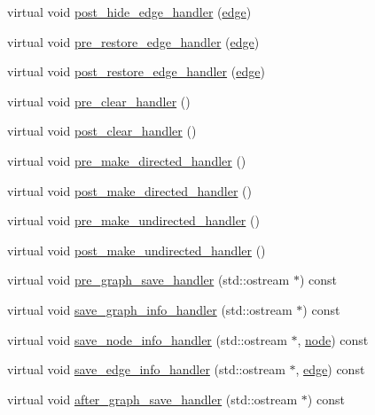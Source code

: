 \begin{DoxyCompactItemize}
virtual void \mbox{\hyperlink{classgraph_ad4614e74a125054eb3e180f6f32ab7bb}{post\+\_\+hide\+\_\+edge\+\_\+handler}} (\mbox{\hyperlink{classedge}{edge}})
\item 
virtual void \mbox{\hyperlink{classgraph_a569d227d9f4914278a143d52139e3303}{pre\+\_\+restore\+\_\+edge\+\_\+handler}} (\mbox{\hyperlink{classedge}{edge}})
\item 
virtual void \mbox{\hyperlink{classgraph_adfc71011ae82f047c550eba6d9e7bb3a}{post\+\_\+restore\+\_\+edge\+\_\+handler}} (\mbox{\hyperlink{classedge}{edge}})
\item 
virtual void \mbox{\hyperlink{classgraph_a16ccad78837d16be59854549cd2d847a}{pre\+\_\+clear\+\_\+handler}} ()
\item 
virtual void \mbox{\hyperlink{classgraph_a870633528590b7925cd27776bdd2bbd2}{post\+\_\+clear\+\_\+handler}} ()
\item 
virtual void \mbox{\hyperlink{classgraph_a505198f412b1e426e9d09b62ea9811e8}{pre\+\_\+make\+\_\+directed\+\_\+handler}} ()
\item 
virtual void \mbox{\hyperlink{classgraph_a43dc35def3d8125eb8f3841d55e0b1c8}{post\+\_\+make\+\_\+directed\+\_\+handler}} ()
\item 
virtual void \mbox{\hyperlink{classgraph_a8964107991e6f411ba8992f6b1deda21}{pre\+\_\+make\+\_\+undirected\+\_\+handler}} ()
\item 
virtual void \mbox{\hyperlink{classgraph_a3d2bc348d12931aff1d2e97a6b4285c3}{post\+\_\+make\+\_\+undirected\+\_\+handler}} ()
\item 
virtual void \mbox{\hyperlink{classgraph_ab257e02f6fd04fef244032a3a15bec9f}{pre\+\_\+graph\+\_\+save\+\_\+handler}} (std\+::ostream $\ast$) const
\item 
virtual void \mbox{\hyperlink{classgraph_a0f20022d6f4951b8836a204aa85b7693}{save\+\_\+graph\+\_\+info\+\_\+handler}} (std\+::ostream $\ast$) const
\item 
virtual void \mbox{\hyperlink{classgraph_a994f87e1b7f1f723cf03e54e2eb7a99d}{save\+\_\+node\+\_\+info\+\_\+handler}} (std\+::ostream $\ast$, \mbox{\hyperlink{classnode}{node}}) const
\item 
virtual void \mbox{\hyperlink{classgraph_a37bb8d0951691e37cdfb271229960f9c}{save\+\_\+edge\+\_\+info\+\_\+handler}} (std\+::ostream $\ast$, \mbox{\hyperlink{classedge}{edge}}) const
\item 
virtual void \mbox{\hyperlink{classgraph_af0c7aba21d57d827ae96cae632441651}{after\+\_\+graph\+\_\+save\+\_\+handler}} (std\+::ostream $\ast$) const
\item 

\end{DoxyCompactItemize}
